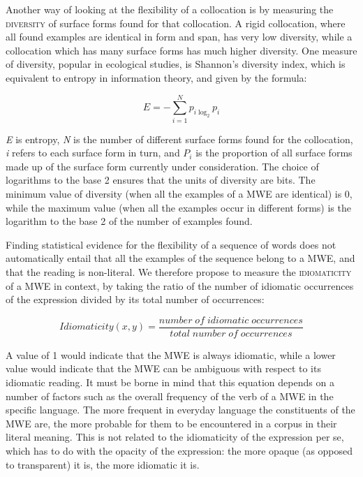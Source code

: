 \documentclass[output=paper]{langsci/langscibook}
\begin{document}
Another way of looking at the flexibility of a collocation is by
measuring the  \textsc{diversity} of surface forms found for
that collocation. A rigid collocation, where all found examples are
identical in form and span, has very low diversity, while a collocation
which has many surface forms has much higher diversity. One measure of
diversity, popular in ecological studies, is Shannon’s diversity index,
which is equivalent to entropy in information theory, and given by the
formula:


\begin{equation*}
E=-\sum _{i=1}^Np_{i\log _2}p_i
\end{equation*}





\textit{E} is entropy, \textit{N} is
the number of different surface forms found for the collocation,
\textit{i} refers to each surface form in turn,
and\textit{ } $P_i$ is the proportion of all surface
forms made up of the surface form currently under consideration. The
choice of logarithms to the base 2 ensures that the units of diversity
are bits. The minimum value of diversity (when all the examples of a
MWE are identical) is 0, while the maximum value (when all the examples
occur in different forms) is the logarithm to the base 2 of the number
of examples found.

Finding statistical evidence for the flexibility of a sequence of words
does not automatically entail that all the examples of the sequence
belong to a MWE, and that the reading is non-literal. We therefore
propose to measure the  \textsc{idiomaticity} of a MWE in
context, by taking the ratio of the number of idiomatic occurrences of
the expression divided by its total number of occurrences:


\begin{equation*}
\mathit{Idiomaticity}\left(x,y\right)=\frac{\mathit{number}\;\mathit{of}\; \mathit{idiomatic}\; \mathit{occurrences}}{\mathit{total}\; \mathit{number}\; \mathit{of}\; \mathit{occurrences}}
\end{equation*}


A value of 1 would indicate that the MWE is always idiomatic, while a
lower value would indicate that the MWE can be ambiguous with respect
to its idiomatic reading. It must be borne in mind that this equation
depends on a number of factors such as the overall frequency of the
verb of a MWE in the specific language. The more frequent in everyday
language the constituents of the MWE are, the more probable for them to
be encountered in a corpus in their literal meaning. This is not
related to the idiomaticity of the expression per se, which has to do
with the opacity of the expression: the more opaque (as opposed to
transparent) it is, the more idiomatic it is.
\end{document}
